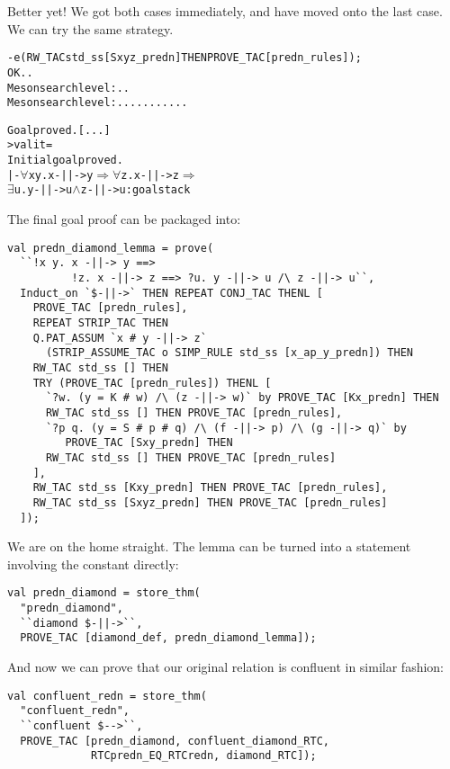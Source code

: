 Better yet! We got both cases immediately, and have moved onto the
last case.  We can try the same strategy.
\begin{session}
\begin{alltt}
- e (RW_TAC std_ss [Sxyz_predn] THEN PROVE_TAC [predn_rules]);
OK..
Meson search level: ..
Meson search level: ...........

Goal proved.[...]
> val it =
    Initial goal proved.
    |- \(\forall\)x y. x -||-> y \(\Rightarrow\) \(\forall\)z. x -||-> z \(\Rightarrow\)
             \(\exists\)u. y -||-> u \(\land\) z -||-> u : goalstack
\end{alltt}
\end{session}
The final goal proof can be packaged into:
\begin{session}
\begin{verbatim}
val predn_diamond_lemma = prove(
  ``!x y. x -||-> y ==>
          !z. x -||-> z ==> ?u. y -||-> u /\ z -||-> u``,
  Induct_on `$-||->` THEN REPEAT CONJ_TAC THENL [
    PROVE_TAC [predn_rules],
    REPEAT STRIP_TAC THEN
    Q.PAT_ASSUM `x # y -||-> z`
      (STRIP_ASSUME_TAC o SIMP_RULE std_ss [x_ap_y_predn]) THEN
    RW_TAC std_ss [] THEN
    TRY (PROVE_TAC [predn_rules]) THENL [
      `?w. (y = K # w) /\ (z -||-> w)` by PROVE_TAC [Kx_predn] THEN
      RW_TAC std_ss [] THEN PROVE_TAC [predn_rules],
      `?p q. (y = S # p # q) /\ (f -||-> p) /\ (g -||-> q)` by
         PROVE_TAC [Sxy_predn] THEN
      RW_TAC std_ss [] THEN PROVE_TAC [predn_rules]
    ],
    RW_TAC std_ss [Kxy_predn] THEN PROVE_TAC [predn_rules],
    RW_TAC std_ss [Sxyz_predn] THEN PROVE_TAC [predn_rules]
  ]);
\end{verbatim}
\end{session}
\eos{}

We are on the home straight.  The lemma can be turned into a statement
involving the  constant directly:
\begin{session}
\begin{verbatim}
val predn_diamond = store_thm(
  "predn_diamond",
  ``diamond $-||->``,
  PROVE_TAC [diamond_def, predn_diamond_lemma]);
\end{verbatim}
\end{session}

And now we can prove that our original relation is confluent in
similar fashion:

\begin{session}
\begin{verbatim}
val confluent_redn = store_thm(
  "confluent_redn",
  ``confluent $-->``,
  PROVE_TAC [predn_diamond, confluent_diamond_RTC,
             RTCpredn_EQ_RTCredn, diamond_RTC]);
\end{verbatim}
\end{session}



